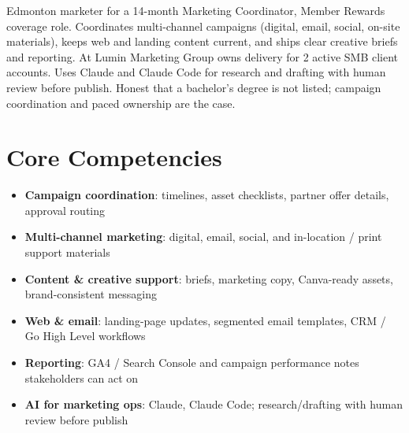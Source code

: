 \documentclass[11pt,a4paper,sans]{moderncv}
\begin{document}
\makecvtitle

\vspace{6pt}
\small{Edmonton marketer for a 14-month Marketing Coordinator, Member Rewards coverage role. Coordinates multi-channel campaigns (digital, email, social, on-site materials), keeps web and landing content current, and ships clear creative briefs and reporting. At Lumin Marketing Group owns delivery for 2 active SMB client accounts. Uses Claude and Claude Code for research and drafting with human review before publish. Honest that a bachelor's degree is not listed; campaign coordination and paced ownership are the case.}

\section{Core Competencies}
\vspace{1pt}
\begin{itemize}
\item \textbf{Campaign coordination}: timelines, asset checklists, partner offer details, approval routing
\item \textbf{Multi-channel marketing}: digital, email, social, and in-location / print support materials
\item \textbf{Content \& creative support}: briefs, marketing copy, Canva-ready assets, brand-consistent messaging
\item \textbf{Web \& email}: landing-page updates, segmented email templates, CRM / Go High Level workflows
\item \textbf{Reporting}: GA4 / Search Console and campaign performance notes stakeholders can act on
\item \textbf{AI for marketing ops}: Claude, Claude Code; research/drafting with human review before publish
\end{itemize}
\end{document}
